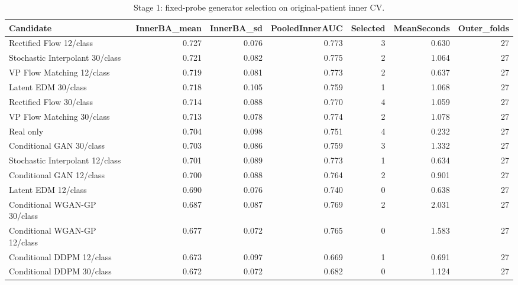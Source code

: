 \begin{table}[t]
\centering
\caption{Stage 1: fixed-probe generator selection on original-patient inner CV.}
\footnotesize
\begin{tabular}{lrrrrrr}
\toprule
Candidate & InnerBA\_mean & InnerBA\_sd & PooledInnerAUC & Selected & MeanSeconds & Outer\_folds \\
\midrule
Rectified Flow 12/class & 0.727 & 0.076 & 0.773 & 3 & 0.630 & 27 \\
Stochastic Interpolant 30/class & 0.721 & 0.082 & 0.775 & 2 & 1.064 & 27 \\
VP Flow Matching 12/class & 0.719 & 0.081 & 0.773 & 2 & 0.637 & 27 \\
Latent EDM 30/class & 0.718 & 0.105 & 0.759 & 1 & 1.068 & 27 \\
Rectified Flow 30/class & 0.714 & 0.088 & 0.770 & 4 & 1.059 & 27 \\
VP Flow Matching 30/class & 0.713 & 0.078 & 0.774 & 2 & 1.078 & 27 \\
Real only & 0.704 & 0.098 & 0.751 & 4 & 0.232 & 27 \\
Conditional GAN 30/class & 0.703 & 0.086 & 0.759 & 3 & 1.332 & 27 \\
Stochastic Interpolant 12/class & 0.701 & 0.089 & 0.773 & 1 & 0.634 & 27 \\
Conditional GAN 12/class & 0.700 & 0.088 & 0.764 & 2 & 0.901 & 27 \\
Latent EDM 12/class & 0.690 & 0.076 & 0.740 & 0 & 0.638 & 27 \\
Conditional WGAN-GP 30/class & 0.687 & 0.087 & 0.769 & 2 & 2.031 & 27 \\
Conditional WGAN-GP 12/class & 0.677 & 0.072 & 0.765 & 0 & 1.583 & 27 \\
Conditional DDPM 12/class & 0.673 & 0.097 & 0.669 & 1 & 0.691 & 27 \\
Conditional DDPM 30/class & 0.672 & 0.072 & 0.682 & 0 & 1.124 & 27 \\
\bottomrule
\end{tabular}
\end{table}
